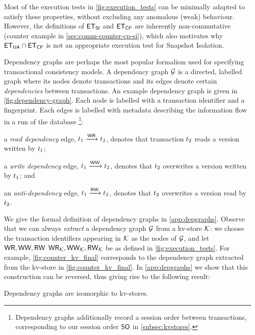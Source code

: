 Most of the execution tests in \cref{fig:execution_tests} can be minimally adapted to satisfy these 
properties, without excluding any anomalous (weak) behaviour. However, the definitions 
of $\mathsf{ET}_{\mathsf{SI}}$ and $\mathsf{ET}_{\mathsf{CP}}$ are inherently non-commutative (counter example in \cref{sec:comm-counter-cp-si}), which also motivates 
why $\mathsf{ET}_{\mathsf{UA}} \cap \mathsf{ET}_{\mathsf{CP}}$ is not an appropriate execution test for Snapshot Isolation.

Dependency graphs \cite{adya-icde,adya} are perhaps the most popular 
formalism used for specifying transactional consistency models. 
A dependency graph $\mathcal{G}$ is a directed, labelled graph where its
nodes denote transactions and its edges denote certain \emph{dependencies} between transactions.  
An example dependency graph is given in \cref{fig:dependency-graph}.
Each node is labelled with a transaction identifier and a fingerprint.
Each edges is labelled with metadata describing the information flow in a run of the database%
\footnote{Dependency graphs additionally record a session order between transactions, corresponding to our session order $\mathsf{SO}$ in \cref{subsec:kvstores}.}:
\begin{enumerate*}
	\item a \emph{read dependency} edge, $t_1 \xrightarrow{\mathsf{WR}} t_2$, denotes
that transaction $t_2$ reads a version written by $t_1$;
	\item a \emph{write dependency} edge, $t_1 \xrightarrow{\mathsf{WW}} t_2$, denotes that $t_2$ overwrites a version written by $t_1$; and 
	\item an \emph{anti-dependency} edge, $t_1 \xrightarrow{\mathsf{RW}} t_2$, denotes that $t_2$ overwrites a version read by $t_2$. 
\end{enumerate*}
We give the formal definition of dependency graphs in \cref{app:depgraphs}.
Observe that we can always \emph{extract} a dependency graph  $\mathcal{G}$ from a kv-store $\mathcal{K}$:
we choose the transaction identifiers appearing in $\mathcal{K}$ as the nodes of $\mathcal{G}$, 
and let $\mathsf{WR}, \mathsf{WW}, \mathsf{RW}$  $\mathsf{WR}_{\mathcal{K}}, \mathsf{WW}_{\mathcal{K}}, \mathsf{RW}_{\mathcal{K}}$ be as defined in \cref{fig:execution_tests}.
For example, \cref{fig:counter_kv_final} corresponds to the dependency graph extracted from the kv-store in \cref{fig:counter_kv_final}.
In \cref{app:depgraphs} we show that this construction can be reversed, thus giving 
rise to the following result: 
\begin{theorem}
\label{thm:kv_graph_isomorph}
Dependency graphs are isomorphic to kv-stores.
\end{theorem}

